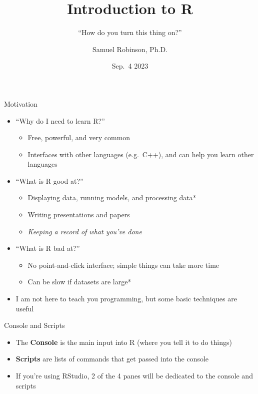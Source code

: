\documentclass[
  ignorenonframetext,
  aspectratio=169]{beamer}
\title{Introduction to R}
\subtitle{``How do you turn this thing on?''}
\author{Samuel Robinson, Ph.D.}
\date{Sep.~4 2023}
\providecommand{\tightlist}{%
  \setlength{\itemsep}{0pt}\setlength{\parskip}{0pt}}
\begin{document}
\frame{\titlepage}

\begin{frame}{Motivation}
\protect\hypertarget{motivation}{}
\begin{itemize}[<+->]
\tightlist
\item
  ``Why do I need to learn R?''

  \begin{itemize}[<+->]
  \tightlist
  \item
    Free, powerful, and very common
  \item
    Interfaces with other languages (e.g.~C++), and can help you learn
    other languages
  \end{itemize}
\item
  ``What is R good at?''

  \begin{itemize}[<+->]
  \tightlist
  \item
    Displaying data, running models, and processing data*
  \item
    Writing presentations and papers
  \item
    \emph{Keeping a record of what you've done}
  \end{itemize}
\item
  ``What is R bad at?''

  \begin{itemize}[<+->]
  \tightlist
  \item
    No point-and-click interface; simple things can take more time
  \item
    Can be slow if datasets are large*
  \end{itemize}
\item
  I am not here to teach you programming, but some basic techniques are
  useful
\end{itemize}
\end{frame}

\begin{frame}{Console and Scripts}
\protect\hypertarget{console-and-scripts}{}
\begin{itemize}[<+->]
\tightlist
\item
  The \textbf{Console} is the main input into R (where you tell it to do
  things)
\item
  \textbf{Scripts} are lists of commands that get passed into the
  console
\item
  If you're using RStudio, 2 of the 4 panes will be dedicated to the
  console and scripts
\end{itemize}
\end{frame}
\end{document}
